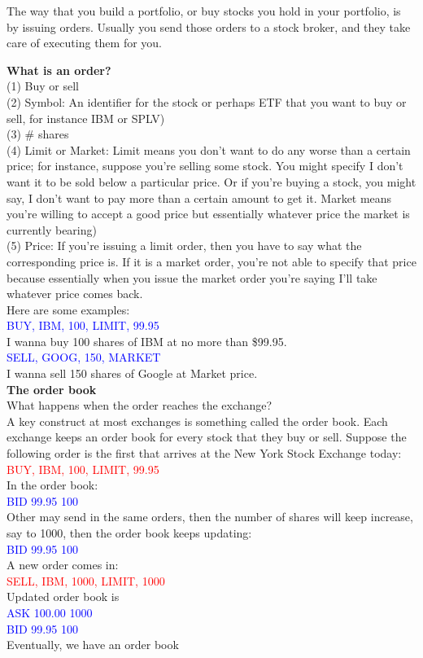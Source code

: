 \documentclass[12pt]{article}
\begin{document}
The way that you build a portfolio, or buy stocks you hold in your portfolio, is by issuing orders. Usually you send those orders to a stock broker, and they take care of executing them for you. 

\noindent
\textbf{What is an order?} \\
(1) Buy or sell \\
(2) Symbol: An identifier for the stock or perhaps ETF that you want to buy or sell, for instance IBM or SPLV) \\
(3) \# shares \\
(4) Limit or Market: Limit means you don't want to do any worse than a certain price; for instance, suppose you're selling some stock. You might specify I don't want it to be sold below a particular price. Or if you're buying a stock, you might say, I don't want to pay more than a certain amount to get it. Market means you're willing to accept a good price but essentially whatever price the market is currently bearing) \\
(5) Price: If you're issuing a limit order, then you have to say what the corresponding price is. If it is a market order, you're not able to specify that price because essentially when you issue the market order you're saying I'll take whatever price comes back. \\ [8pt]
\noindent
Here are some examples: \\
\textcolor{blue}{BUY, IBM, 100, LIMIT, 99.95} \\
I wanna buy 100 shares of IBM at no more than \$99.95. \\
\textcolor{blue}{SELL, GOOG, 150, MARKET} \\
I wanna sell 150 shares of Google at Market price. \\[8pt]
\noindent
\textbf{The order book} \\
What happens when the order reaches the exchange?\\
A key construct at most exchanges is something called the order book. Each exchange keeps an order book for every stock that they buy or sell. Suppose the following order is the first that arrives at the New York Stock Exchange today:\\
\textcolor{red}{BUY, IBM, 100, LIMIT, 99.95} \\
In the order book: \\
\textcolor{blue}{BID\,\,99.95\,\,100} \\
Other may send in the same orders, then the number of shares will keep increase, say to 1000, then the order book keeps updating: \\
\textcolor{blue}{BID\,\,99.95\,\,100} \\
A new order comes in: \\
\textcolor{red}{SELL, IBM, 1000, LIMIT, 1000} \\
Updated order book is \\
\textcolor{blue}{ASK\,\,100.00\,\,1000} \\
\textcolor{blue}{BID\,\,99.95\,\,100} \\
Eventually, we have an order book 
\end{document}
